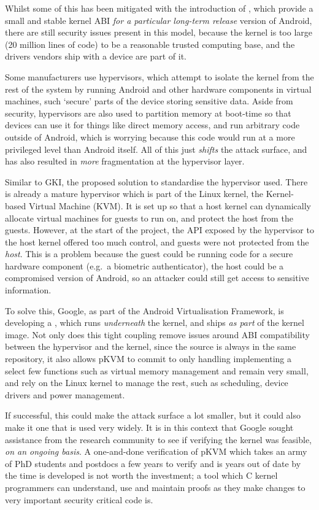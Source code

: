 Whilst some of this has been mitigated with the introduction of
, which provide a small and stable
kernel ABI \emph{for a particular long-term release} version of Android, there
are still security issues present in this model, because the kernel is too
large (20 million lines of code) to be a reasonable trusted computing base, and
the drivers vendors ship with a device are part of it.

Some manufacturers use hypervisors, which attempt to isolate the kernel from
the rest of the system by running Android and other hardware components in
virtual machines, such `secure' parts of the device storing sensitive data.
Aside from security, hypervisors are also used to partition memory at boot-time
so that devices can use it for things like direct memory access, and run
arbitrary code outside of Android, which is worrying because this code would
run at a more privileged level than Android itself. All of this just
\emph{shifts} the attack surface, and has also resulted in \emph{more}
fragmentation at the hypervisor layer.

Similar to GKI, the proposed solution to standardise the hypervisor used. There
is already a mature hypervisor which is part of the Linux kernel, the
Kernel-based Virtual Machine (KVM)\@. It is set up so that a host kernel can
dynamically allocate virtual machines for guests to run on, and protect the
host from the guests. However, at the start of the project, the API exposed by
the hypervisor to the host kernel offered too much control, and guests were not
protected from the \emph{host}. This is a problem because the guest could be
running code for a secure hardware component (e.g.\ a biometric authenticator),
the host could be a compromised version of Android, so an attacker could still
get access to sensitive information.

To solve this, Google, as part of the Android Virtualisation Framework, is
developing a , which runs \emph{underneath}
the kernel, and ships \emph{as part} of the kernel image. Not only does this
tight coupling remove issues around ABI compatibility between the hypervisor
and the kernel, since the source is always in the same repository, it also
allows pKVM to commit to only handling implementing a select few functions such
as virtual memory management and remain very small, and rely on the Linux
kernel to manage the rest, such as scheduling, device drivers and power
management.

If successful, this could make the attack surface a lot smaller, but it could
also make it one that is used very widely. It is in this context that Google
sought assistance from the research community to see if verifying the kernel
was feasible, \emph{on an ongoing basis}. A one-and-done verification of pKVM
which takes an army of PhD students and postdocs a few years to verify and is
years out of date by the time is developed is not worth the investment; a
tool which C kernel programmers can understand, use and maintain proofs as they
make changes to very important security critical code is.

